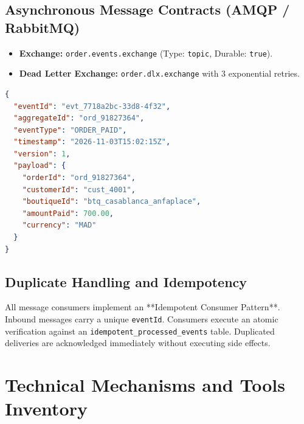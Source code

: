 \documentclass[11pt,a4paper]{article}
\begin{document}
\subsection{Asynchronous Message Contracts (AMQP / RabbitMQ)}
\begin{itemize}
    \item \textbf{Exchange:} \texttt{order.events.exchange} (Type: \texttt{topic}, Durable: \texttt{true}).
    \item \textbf{Dead Letter Exchange:} \texttt{order.dlx.exchange} with 3 exponential retries.
\end{itemize}

\begin{lstlisting}[language=json,caption={Event Payload: OrderPaidEvent (Routing key: order.lifecycle.paid)}]
{
  "eventId": "evt_7718a2bc-33d8-4f32",
  "aggregateId": "ord_91827364",
  "eventType": "ORDER_PAID",
  "timestamp": "2026-11-03T15:02:15Z",
  "version": 1,
  "payload": {
    "orderId": "ord_91827364",
    "customerId": "cust_4001",
    "boutiqueId": "btq_casablanca_anfaplace",
    "amountPaid": 700.00,
    "currency": "MAD"
  }
}
\end{lstlisting}

\subsection{Duplicate Handling and Idempotency}
All message consumers implement an **Idempotent Consumer Pattern**. Inbound messages carry a unique \texttt{eventId}. Consumers execute an atomic verification against an \texttt{idempotent\_processed\_events} table. Duplicated deliveries are acknowledged immediately without executing side effects.

\newpage
\section{Technical Mechanisms and Tools Inventory}
\end{document}
